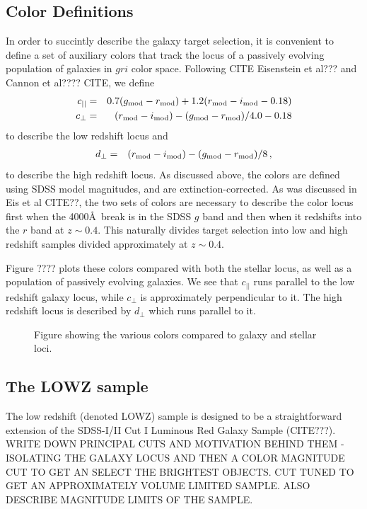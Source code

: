 \documentclass[preprint]{aastex}
\newcommand{\cpp}{c_{\perp}}
\newcommand{\cll}{c_{||}}
\newcommand{\dpp}{d_{\perp}}
\newcommand{\gmod}{g_{\rm mod}}
\newcommand{\rmod}{r_{\rm mod}}
\newcommand{\imod}{i_{\rm mod}}
\begin{document}
\subsection{Color Definitions}

In order to succintly describe the galaxy target selection, it is convenient to
define a set of auxiliary colors that track the locus of a passively evolving
population of galaxies in $gri$ color space. Following CITE Eisenstein et al???
and Cannon et al???? CITE, we define 
\begin{eqnarray}
\cll & = &  0.7 (\gmod - \rmod) + 1.2(\rmod - \imod - 0.18)  \\
\cpp & = & (\rmod - \imod) - (\gmod - \rmod)/4.0 - 0.18 
\end{eqnarray}
to describe the low redshift locus and 
\begin{eqnarray}
\dpp & = & (\rmod - \imod) - (\gmod - \rmod)/8 \,,
\end{eqnarray}
to describe the high redshift locus. As discussed above, the colors are defined
using SDSS model magnitudes, and are extinction-corrected. As was discussed in
Eis et al CITE??, the two sets of colors are necessary to describe the color
locus first when the 4000\AA\ break is in the SDSS $g$ band and then when it
redshifts into the $r$ band at $z\sim0.4$. This naturally divides target
selection into low and high redshift samples divided approximately at
$z\sim0.4$. 

Figure ???? plots these colors compared with both the stellar locus,
as well as a population of passively evolving galaxies. We see that $\cll$ runs
parallel to the low redshift galaxy locus, while $\cpp$ is approximately
perpendicular to it. The high redshift locus is described by $\dpp$ which runs
parallel to it. 

\begin{figure}
\caption{Figure showing the various colors compared to galaxy and stellar loci.}
\label{fig:color}
\end{figure}

\subsection{The LOWZ sample}

The low redshift (denoted LOWZ) sample is designed to be a straightforward
extension of the SDSS-I/II Cut I Luminous Red Galaxy Sample (CITE???).
WRITE DOWN PRINCIPAL CUTS AND MOTIVATION BEHIND THEM - ISOLATING THE GALAXY
LOCUS AND THEN A COLOR MAGNITUDE CUT TO GET AN SELECT THE BRIGHTEST OBJECTS. 
CUT TUNED TO GET AN APPROXIMATELY VOLUME LIMITED SAMPLE. ALSO DESCRIBE MAGNITUDE
LIMITS OF THE SAMPLE.
\end{document}
